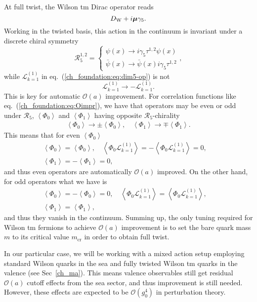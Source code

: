 At full twist, the Wilson tm Dirac operator reads
\begin{equation}
D_{\textrm W}+i\boldsymbol{\mu}\gamma_5.
\end{equation}
Working in the twisted basis, this action in the continuum is invariant under a discrete chiral symmetry 
\begin{equation}
\mathcal{R}_5^{1,2}=\left\{\begin{matrix}
\psi(x)\rightarrow i\gamma_5\tau^{1,2}\psi(x) \\ 
\bar{\psi}(x)\rightarrow \bar{\psi}(x)i\gamma_5\tau^{1,2}
\end{matrix}\right.,
\end{equation}
while $\mathcal{L}_{k=1}^{(1)}$ in eq.~(\ref{ch_foundation:eq:dim5-op}) is not 
\begin{equation}
\mathcal{L}_{k=1}^{(1)}\rightarrow-\mathcal{L}_{k=1}^{(1)}.
\end{equation}
This is key for automatic $\mathcal{O}(a)$ improvement. For correlation functions like eq.~(\ref{ch_foundation:eq:Oimpr}), we have that operators may be even or odd under $\mathcal{R}_5$, $\left<\Phi_0\right>$ and $\left<\Phi_1\right>$ having opposite $\mathcal{R}_5$-chirality
\begin{gather}
\left<\Phi_0\right>\rightarrow\pm\left<\Phi_0\right>, \quad \left<\Phi_1\right>\rightarrow\mp\left<\Phi_1\right>.
\end{gather}
This means that for even $\left<\Phi_0\right>$
\begin{gather}
\left<\Phi_0\right>=\left<\Phi_0\right>,
\quad \left<\Phi_0\mathcal{L}^{(1)}_{k=1}\right>=-\left<\Phi_0\mathcal{L}^{(1)}_{k=1}\right>=0, \quad \\ \left<\Phi_1\right>=-\left<\Phi_1\right>=0,
\end{gather}
and thus even operators are automatically $\mathcal{O}(a)$ improved. On the other hand, for odd operators what we have is
\begin{gather}
\left<\Phi_0\right>=-\left<\Phi_0\right>=0, \quad
\left<\Phi_0\mathcal{L}^{(1)}_{k=1}\right>=\left<\Phi_0\mathcal{L}^{(1)}_{k=1}\right>, \quad \\ \left<\Phi_1\right>=\left<\Phi_1\right>,
\end{gather}
and thus they vanish in the continuum. Summing up, the only tuning required for Wilson tm fermions to achieve $\mathcal{O}(a)$ improvement is to set the bare quark mass $m$ to its critical value $m_{\textrm{cr}}$ in order to obtain full twist.

In our particular case, we will be working with a mixed action setup employing standard Wilson quarks in the sea and fully twisted Wilson tm quarks in the valence (see Sec~\ref{ch_ma}). This means valence observables still get residual $\mathcal{O}(a)$ cutoff effects from the sea sector, and thus improvement is still needed. However, these effects are expected to be $\mathcal{O}(g_0^4)$ in perturbation theory.

